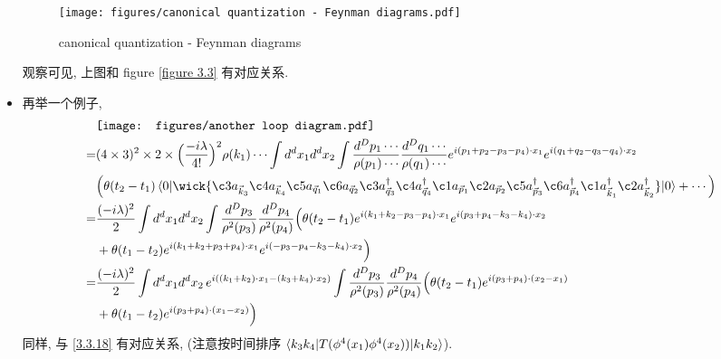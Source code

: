 \begin{itemize}
	\begin{figure}[H]
		\centering
		\texttt{[image: figures/canonical quantization - Feynman diagrams.pdf]}
		\caption{canonical quantization - Feynman diagrams}
	\end{figure}
	
	观察可见, 上图和 figure \ref{figure 3.3} 有对应关系.
	
	\item 再举一个例子,
	\begin{align}
		& \vcenter{\hbox{\texttt{[image: figures/another loop diagram.pdf]}}} \notag \\
		=& (4 \times 3)^2 \times 2 \times \Big( \frac{- i \lambda}{4!} \Big)^2 \rho(k_1) \cdots \int d^d x_1 d^d x_2 \int \frac{d^D p_1 \cdots}{\rho(p_1) \cdots} \frac{d^D q_1 \cdots}{\rho(q_1) \cdots} e^{i (p_1 + p_2 - p_3 - p_4) \cdot x_1} e^{i (q_1 + q_2 - q_3 - q_4) \cdot x_2} \notag \\
		& \Big( \theta(t_2 - t_1) \braket{0 | \wick{
			\c3 a_{\vec{k}_3} \c4 a_{\vec{k}_4} \c5 a_{\vec{q}_1} \c6 a_{\vec{q}_2} \c3 a^\dag_{\vec{q}_3} \c4 a^\dag_{\vec{q}_4} \c1 a_{\vec{p}_1} \c2 a_{\vec{p}_2} \c5 a^\dag_{\vec{p}_3} \c6 a^\dag_{\vec{p}_4} \c1 a^\dag_{\vec{k}_1} \c2 a^\dag_{\vec{k}_2}
		} | 0} + \cdots \Big) \notag \\
		=& \frac{(- i \lambda)^2}{2} \int d^d x_1 d^d x_2 \int \frac{d^D p_3}{\rho^2(p_3)} \frac{d^D p_4}{\rho^2(p_4)} \Big( \theta(t_2 - t_1) e^{i (k_1 + k_2 - p_3 - p_4) \cdot x_1} e^{i (p_3 + p_4 - k_3 - k_4) \cdot x_2} \notag \\
		& + \theta(t_1 - t_2) e^{i (k_1 + k_2 + p_3 + p_4) \cdot x_1} e^{i (- p_3 - p_4 - k_3 - k_4) \cdot x_2} \Big) \notag \\
		=& \frac{(- i \lambda)^2}{2} \int d^d x_1 d^d x_2 \, e^{i ((k_1 + k_2) \cdot x_1 - (k_3 + k_4) \cdot x_2)} \int \frac{d^D p_3}{\rho^2(p_3)} \frac{d^D p_4}{\rho^2(p_4)} \Big( \theta(t_2 - t_1) e^{i (p_3 + p_4) \cdot (x_2 - x_1)} \notag \\
		& + \theta(t_1 - t_2) e^{i (p_3 + p_4) \cdot (x_1 - x_2)} \Big) \label{4.3.5}
	\end{align}
	同样, 与 \eqref{3.3.18} 有对应关系, (注意按时间排序 $\braket{k_3 k_4 | T(\phi^4(x_1) \phi^4(x_2)) | k_1 k_2}$).
	

\end{itemize}

